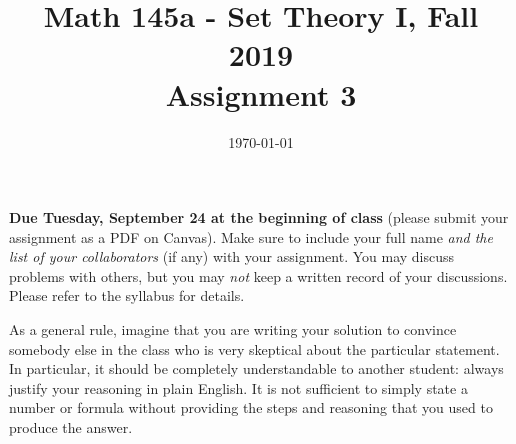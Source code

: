 \documentclass{amsart}
\title[Math 145a, Fall 2019: assignment 3]{Math 145a - Set Theory I, Fall 2019 \\ Assignment 3}
\date{\today}
\theoremstyle{definition}
\begin{document}

\vspace*{-10em}

\maketitle

\textbf{Due Tuesday, September 24 at the beginning of class} (please submit your assignment as a PDF on Canvas). Make sure to include your full name \emph{and the list of your collaborators} (if any) with your assignment. You may discuss problems with others, but you may \emph{not} keep a written record of your discussions. Please refer to the syllabus for details.

As a general rule, imagine that you are writing your solution to convince somebody else in the class who is very skeptical about the particular statement. In particular, it should be completely understandable to another student: always justify your reasoning in plain English. It is not sufficient to simply state a number or formula without providing the steps and reasoning that you used to produce the answer.
\end{document}
